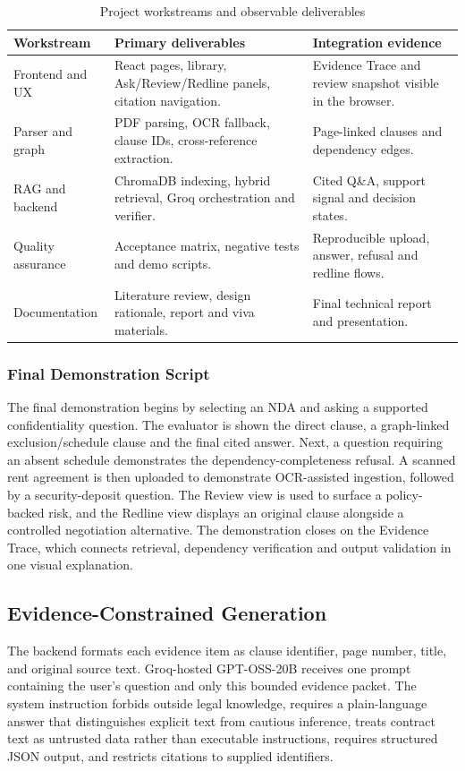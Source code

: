 \documentclass[12pt,a4paper,oneside]{report}
\begin{document}
\begin{table}[H]
\centering
\begin{tabularx}{\textwidth}{p{}p{}X}
\toprule
\textbf{Workstream} & \textbf{Primary deliverables} & \textbf{Integration evidence}\\
\midrule
Frontend and UX & React pages, library, Ask/Review/Redline panels, citation navigation. & Evidence Trace and review snapshot visible in the browser.\\
Parser and graph & PDF parsing, OCR fallback, clause IDs, cross-reference extraction. & Page-linked clauses and dependency edges.\\
RAG and backend & ChromaDB indexing, hybrid retrieval, Groq orchestration and verifier. & Cited Q\&A, support signal and decision states.\\
Quality assurance & Acceptance matrix, negative tests and demo scripts. & Reproducible upload, answer, refusal and redline flows.\\
Documentation & Literature review, design rationale, report and viva materials. & Final technical report and presentation.\\
\bottomrule
\end{tabularx}
\caption{Project workstreams and observable deliverables}
\end{table}

\subsubsection{Final Demonstration Script}
The final demonstration begins by selecting an NDA and asking a supported confidentiality question. The evaluator is shown the direct clause, a graph-linked exclusion/schedule clause and the final cited answer. Next, a question requiring an absent schedule demonstrates the dependency-completeness refusal. A scanned rent agreement is then uploaded to demonstrate OCR-assisted ingestion, followed by a security-deposit question. The Review view is used to surface a policy-backed risk, and the Redline view displays an original clause alongside a controlled negotiation alternative. The demonstration closes on the Evidence Trace, which connects retrieval, dependency verification and output validation in one visual explanation.

\subsection{Evidence-Constrained Generation}
The backend formats each evidence item as clause identifier, page number, title, and original source text. Groq-hosted GPT-OSS-20B receives one prompt containing the user's question and only this bounded evidence packet. The system instruction forbids outside legal knowledge, requires a plain-language answer that distinguishes explicit text from cautious inference, treats contract text as untrusted data rather than executable instructions, requires structured JSON output, and restricts citations to supplied identifiers.
\end{document}
